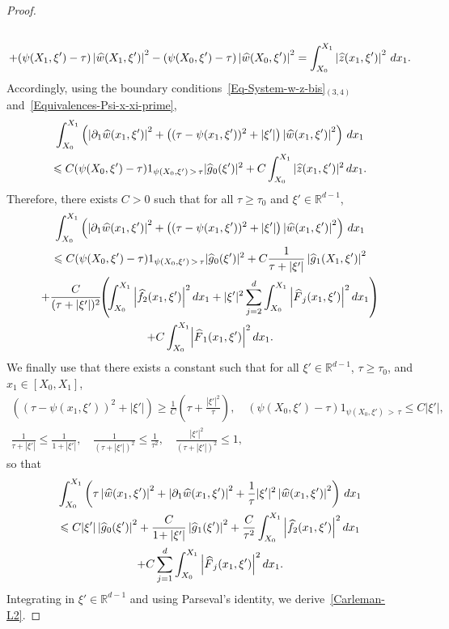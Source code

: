 \documentclass[10pt]{amsart}
\theoremstyle{definition}\newtheorem{defi}[theo]{Definition}\newtheorem{rema}[theo]{Remark}\newtheorem{exam}[theo]{Example}\newtheorem{exem}[theo]{Example}\newtheorem{nota}[theo]{Notation}
\newcommand*\R{\mathbb{R}}
\renewcommand{\leq}{\leqslant}
\renewcommand{\geq}{\geqslant}
\renewcommand{\hat}{\widehat}
\let\oldhat\hat
\renewcommand*{\hat}[1]{\mathchoice{\widehat{#1}}{\widehat{#1}}{\oldhat{#1}}{\oldhat{#1}}}
\begin{document}
\begin{proof}
\begin{multline*}
\\
+ (\psi(X_1, \xi') - \tau) \left|\hat w(X_1, \xi')\right|^2 - (\psi(X_0, \xi') - \tau) \left|\hat w(X_0, \xi')\right|^2 =
\int_{X_0}^{X_1}\left| \hat z(x_1, \xi')\right|^2 \, dx_1.
\end{multline*}
Accordingly, using the boundary conditions~\eqref{Eq-System-w-z-bis}$_{(3,4)}$ and~\eqref{Equivalences-Psi-x-xi-prime},
\begin{multline*}
\int_{X_0}^{X_1}\left(\left|\partial_1 \hat w(x_1, \xi')\right|^2 + \left((\tau - \psi(x_1, \xi'))^2 + |\xi'| \right) \left|\hat w(x_1, \xi')\right|^2\right) \, dx_1
\\
\leq C (\psi(X_0, \xi') - \tau) 1_{\psi(X_0, \xi')\,>\,\tau} |\hat g_0(\xi')|^2 + C \int_{X_0}^{X_1}| \hat z(x_1, \xi')|^2 \, dx_1.
\end{multline*}
Therefore, there exists $C>0$ such that for all $\tau \geq \tau_0$ and $\xi' \in \R^{d-1}$,
\begin{multline*}
\int_{X_0}^{X_1}\left(\left|\partial_1 \hat w(x_1, \xi')\right|^2 + \left((\tau - \psi(x_1, \xi'))^2 + |\xi'| \right) \left|\hat w(x_1, \xi')\right|^2\right) \, dx_1
\\
\leq C (\psi(X_0, \xi') - \tau) 1_{\psi(X_0, \xi')\,>\,\tau} |\hat g_0(\xi')|^2 + C \frac{1}{\tau + |\xi'| } \left|\hat g_1(X_1, \xi')\right|^2
\\
+ \frac{C}{(\tau + |\xi'|)^2}\!\! \left(\!\int_{X_0}^{X_1}\left| \widehat f_2(x_1, \xi') \right|^2 dx_1
+ |\xi'|^2\sum_{j=2}^d \int_{X_0}^{X_1} 
\left| \hat F_j(x_1, \xi')\right|^2 dx_1\right)\\ + C  \int_{X_0}^{X_1} \!\left|\hat F_1(x_1, \xi')\right|^2 dx_1.
\end{multline*}
We finally use that there exists a constant such that for all $\xi' \in \R^{d-1}$, $\tau \geq \tau_0$, and $x_1 \in [X_0, X_1]$,
\begin{multline*}
 \left((\tau - \psi(x_1, \xi'))^2 + |\xi'| \right) \geq \frac{1}{C} \left(\tau + \frac{|\xi'|^2}{\tau} \right),
\quad (\psi(X_0, \xi') - \tau) 1_{\psi(X_0, \xi')\,>\,\tau}
\leq C |\xi'|,\\
\frac{1}{\tau + |\xi'| } \leq \frac{1}{1+|\xi'|},
\quad
\frac{1}{(\tau + |\xi'|)^2 } \leq \frac{1}{\tau^2},
\quad
\frac{|\xi'|^2 }{(\tau + |\xi'|)^2 } \leq 1,
\end{multline*}
so that
\begin{multline*}
\int_{X_0}^{X_1}\left(\tau \left|\hat w(x_1, \xi')\right|^2 + \left|\partial_1 \hat w(x_1, \xi')\right|^2 + \frac{1}{\tau} |\xi'|^2 \left|\hat w(x_1, \xi')\right|^2\right) \, dx_1
\\
\leq C |\xi'|  \left|\hat g_0(\xi')\right|^2 +
\frac{C}{1\! + |\xi'| } \left|\hat g_1(\xi')\right|^2 + \frac{C}{\tau^2}\int_{X_0}^{X_1} \left| \widehat f_2(x_1, \xi')\right|^2 dx_1 \\
+ C \sum_{j=1}^d \int_{X_0}^{X_1} \left| \hat F_j(x_1, \xi')\right|^2 dx_1.
\end{multline*}
Integrating in $\xi' \in \R^{d-1}$ and using Parseval's identity, we derive~\eqref{Carleman-L2}.


\end{proof}
\end{document}
